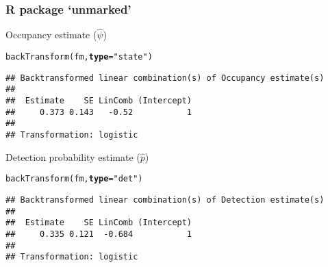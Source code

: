 \documentclass[color=usenames,dvipsnames,handout]{beamer}\usepackage[]{graphicx}\usepackage[]{xcolor}
\makeatletter
\newcommand{\hlsng}[1]{\textcolor[rgb]{0.749,0.012,0.012}{#1}}%
\newcommand{\hldef}[1]{\textcolor[rgb]{0,0,0}{#1}}%
\newcommand{\hlkwc}[1]{\textcolor[rgb]{0,0,0}{\textbf{#1}}}%
\newcommand{\hlkwd}[1]{\textcolor[rgb]{0.004,0.004,0.506}{#1}}%
\newenvironment{kframe}{%
 \def\at@end@of@kframe{}%
 \ifinner\ifhmode%
  \def\at@end@of@kframe{\end{minipage}}%
  \begin{minipage}{\columnwidth}%
 \fi\fi%
 \def\FrameCommand##1{\hskip\@totalleftmargin \hskip-\fboxsep
 \colorbox{shadecolor}{##1}\hskip-\fboxsep
     \hskip-\linewidth \hskip-\@totalleftmargin \hskip\columnwidth}%
 \MakeFramed {\advance\hsize-\width
   \@totalleftmargin\z@ \linewidth\hsize
   \@setminipage}}%
 {\par\unskip\endMakeFramed%
 \at@end@of@kframe}
\newenvironment{knitrout}{}{} %
\makeatother
\begin{document}
\begin{frame}[fragile]
  \frametitle{R package `unmarked'}
Occupancy estimate ($\hat{\psi}$)
\begin{knitrout}\footnotesize
{}\color{fgcolor}\begin{kframe}
\begin{alltt}
\hlkwd{backTransform}\hldef{(fm,} \hlkwc{type}\hldef{=}\hlsng{"state"}\hldef{)}
\end{alltt}
\begin{verbatim}
## Backtransformed linear combination(s) of Occupancy estimate(s)
## 
##  Estimate    SE LinComb (Intercept)
##     0.373 0.143   -0.52           1
## 
## Transformation: logistic
\end{verbatim}
\end{kframe}
\end{knitrout}
\pause
\vfill
Detection probability estimate ($\hat{p}$)
\begin{knitrout}\footnotesize
{}\color{fgcolor}\begin{kframe}
\begin{alltt}
\hlkwd{backTransform}\hldef{(fm,} \hlkwc{type}\hldef{=}\hlsng{"det"}\hldef{)}
\end{alltt}
\begin{verbatim}
## Backtransformed linear combination(s) of Detection estimate(s)
## 
##  Estimate    SE LinComb (Intercept)
##     0.335 0.121  -0.684           1
## 
## Transformation: logistic
\end{verbatim}
\end{kframe}
\end{knitrout}
\end{frame}



\end{document}
